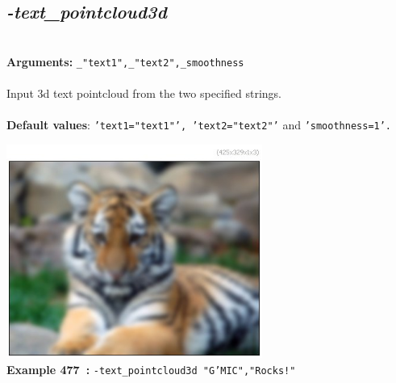 \documentclass[a4paper,11pt,twoside]{book}
\begin{document}
\subsection{\emph{-text\_pointcloud3d} }\vspace*{-0.5em}
~\\\textbf{Arguments: } 
{\small \texttt{\_"text1",\_"text2",\_smoothness}}\\~\\
Input 3d text pointcloud from the two specified strings.
~\\~\\\textbf{Default values}: {\small \texttt{'text1="text1"', 'text2="text2"'} and \texttt{'smoothness=1'.}}
\begin{center}\includegraphics[keepaspectratio=true,height=7cm,width=\textwidth]{img/gmic_def477.jpg}\\
{\footnotesize \textbf{Example 477~:} \texttt{-text\_pointcloud3d "G'MIC","Rocks!"}}
\end{center}
\end{document}
